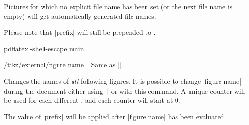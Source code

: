{\begin{command}{}
	Pictures for which no explicit file name has been set (or the next file name is empty) will get automatically generated file names.

	Please note that |prefix| will still be prepended to .
\begin{codeexample}
pdflatex -shell-escape main
\end{codeexample}
\end{command}

\begin{key}{/tikz/external/figure name=}
	Same as ||.
\end{key}
\begin{command}{}
	Changes the names of \emph{all} following figures. It is possible to change |figure name| during the document either using || or with this command. A unique counter will be used for each different , and each counter will start at $0$.

	The value of |prefix| will be applied after |figure name| has been evaluated.
\end{command}}
